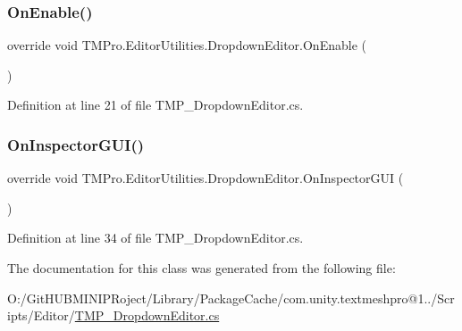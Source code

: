 \subsubsection{\texorpdfstring{OnEnable()}{OnEnable()}}
{\footnotesize\ttfamily override void T\+M\+Pro.\+Editor\+Utilities.\+Dropdown\+Editor.\+On\+Enable (\begin{DoxyParamCaption}{ }\end{DoxyParamCaption})\hspace{0.3cm}{\ttfamily [protected]}}



Definition at line 21 of file T\+M\+P\+\_\+\+Dropdown\+Editor.\+cs.

\mbox{\label{class_t_m_pro_1_1_editor_utilities_1_1_dropdown_editor_a1f54d782eb4d6a0bb713f54636d6138e}} 
\subsubsection{\texorpdfstring{OnInspectorGUI()}{OnInspectorGUI()}}
{\footnotesize\ttfamily override void T\+M\+Pro.\+Editor\+Utilities.\+Dropdown\+Editor.\+On\+Inspector\+G\+UI (\begin{DoxyParamCaption}{ }\end{DoxyParamCaption})}



Definition at line 34 of file T\+M\+P\+\_\+\+Dropdown\+Editor.\+cs.



The documentation for this class was generated from the following file\+:\begin{DoxyCompactItemize}
\item 
O\+:/\+Git\+H\+U\+B\+M\+I\+N\+I\+P\+Roject/\+Library/\+Package\+Cache/com.\+unity.\+textmeshpro@1../\+Scripts/\+Editor/\mbox{\hyperlink{_t_m_p___dropdown_editor_8cs}{T\+M\+P\+\_\+\+Dropdown\+Editor.\+cs}}\end{DoxyCompactItemize}
